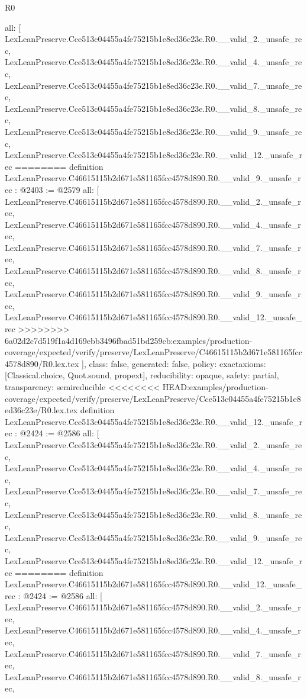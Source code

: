 \begin{lexlean}{R0}
\begin{coremodule}
{{{{{{{{{{{{{{{{{{{{{{{{{{{{{{{{{{{{{{{{{{{{{{{{{{{{{{  all: [
    LexLeanPreserve.Cce513c04455a4fe75215b1e8ed36c23e.R0.__valid_2._unsafe_rec,
    LexLeanPreserve.Cce513c04455a4fe75215b1e8ed36c23e.R0.__valid_4._unsafe_rec,
    LexLeanPreserve.Cce513c04455a4fe75215b1e8ed36c23e.R0.__valid_7._unsafe_rec,
    LexLeanPreserve.Cce513c04455a4fe75215b1e8ed36c23e.R0.__valid_8._unsafe_rec,
    LexLeanPreserve.Cce513c04455a4fe75215b1e8ed36c23e.R0.__valid_9._unsafe_rec,
    LexLeanPreserve.Cce513c04455a4fe75215b1e8ed36c23e.R0.__valid_12._unsafe_rec
========
definition LexLeanPreserve.C46615115b2d671e581165fcc4578d890.R0.__valid_9._unsafe_rec : @2403 := @2579 {
  all: [
    LexLeanPreserve.C46615115b2d671e581165fcc4578d890.R0.__valid_2._unsafe_rec,
    LexLeanPreserve.C46615115b2d671e581165fcc4578d890.R0.__valid_4._unsafe_rec,
    LexLeanPreserve.C46615115b2d671e581165fcc4578d890.R0.__valid_7._unsafe_rec,
    LexLeanPreserve.C46615115b2d671e581165fcc4578d890.R0.__valid_8._unsafe_rec,
    LexLeanPreserve.C46615115b2d671e581165fcc4578d890.R0.__valid_9._unsafe_rec,
    LexLeanPreserve.C46615115b2d671e581165fcc4578d890.R0.__valid_12._unsafe_rec
>>>>>>>> 6a02d2c7d519f1a4d169ebb3496fbad51bd259cb:examples/production-coverage/expected/verify/preserve/LexLeanPreserve/C46615115b2d671e581165fcc4578d890/R0.lex.tex
  ],
  class: false,
  generated: false,
  policy: exact{axioms: [Classical.choice, Quot.sound, propext]},
  reducibility: opaque{},
  safety: partial,
  transparency: semireducible
}
<<<<<<<< HEAD:examples/production-coverage/expected/verify/preserve/LexLeanPreserve/Cce513c04455a4fe75215b1e8ed36c23e/R0.lex.tex
definition LexLeanPreserve.Cce513c04455a4fe75215b1e8ed36c23e.R0.__valid_12._unsafe_rec : @2424 := @2586 {
  all: [
    LexLeanPreserve.Cce513c04455a4fe75215b1e8ed36c23e.R0.__valid_2._unsafe_rec,
    LexLeanPreserve.Cce513c04455a4fe75215b1e8ed36c23e.R0.__valid_4._unsafe_rec,
    LexLeanPreserve.Cce513c04455a4fe75215b1e8ed36c23e.R0.__valid_7._unsafe_rec,
    LexLeanPreserve.Cce513c04455a4fe75215b1e8ed36c23e.R0.__valid_8._unsafe_rec,
    LexLeanPreserve.Cce513c04455a4fe75215b1e8ed36c23e.R0.__valid_9._unsafe_rec,
    LexLeanPreserve.Cce513c04455a4fe75215b1e8ed36c23e.R0.__valid_12._unsafe_rec
========
definition LexLeanPreserve.C46615115b2d671e581165fcc4578d890.R0.__valid_12._unsafe_rec : @2424 := @2586 {
  all: [
    LexLeanPreserve.C46615115b2d671e581165fcc4578d890.R0.__valid_2._unsafe_rec,
    LexLeanPreserve.C46615115b2d671e581165fcc4578d890.R0.__valid_4._unsafe_rec,
    LexLeanPreserve.C46615115b2d671e581165fcc4578d890.R0.__valid_7._unsafe_rec,
    LexLeanPreserve.C46615115b2d671e581165fcc4578d890.R0.__valid_8._unsafe_rec,
}}}}}}}}}}}}}}}}}}}}}}}}}}}}}}}}}}}}}}}}}}}}}}}}}}}}}}}}
\end{coremodule}
\end{lexlean}
